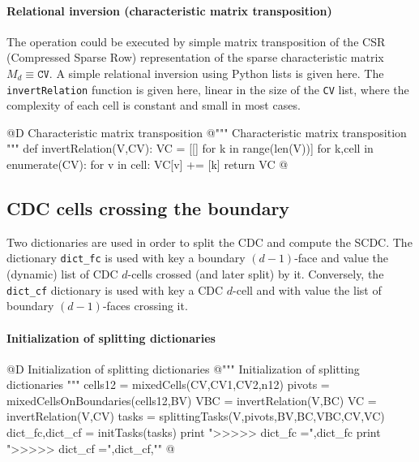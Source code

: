 \documentclass[11pt,oneside]{article}	%
\begin{document}
\paragraph{Relational inversion (characteristic matrix transposition)}

The operation could be executed by simple matrix transposition of the CSR (Compressed Sparse Row) representation of the sparse characteristic matrix $M_d \equiv \texttt{CV}$.
A simple relational inversion using Python lists is given here. The \texttt{invertRelation} function 
is given here, linear in the size of the \texttt{CV} list, where the complexity of each cell is constant and 
small in most cases.

@D Characteristic matrix transposition
@{""" Characteristic matrix transposition """
def invertRelation(V,CV):
	VC = [[] for k in range(len(V))]
	for k,cell in enumerate(CV):
		for v in cell:
			VC[v] += [k]
	return VC
@}

\subsection{CDC cells crossing the boundary}

Two dictionaries are used in order to split the CDC and compute the SCDC. The dictionary \texttt{dict\_fc} is used with key a boundary $(d-1)$-face and value the (dynamic) list of CDC $d$-cells crossed (and later split) by it. Conversely, the  \texttt{dict\_cf} dictionary is used with key a CDC $d$-cell and with value the list of boundary $(d-1)$-faces crossing it.

\paragraph{Initialization of splitting dictionaries}

@D Initialization of splitting dictionaries
@{""" Initialization of splitting dictionaries """
cells12 = mixedCells(CV,CV1,CV2,n12)
pivots = mixedCellsOnBoundaries(cells12,BV)
VBC = invertRelation(V,BC)
VC = invertRelation(V,CV)
tasks = splittingTasks(V,pivots,BV,BC,VBC,CV,VC)
dict_fc,dict_cf = initTasks(tasks)
print "\n>>>>> dict_fc =",dict_fc
print ">>>>> dict_cf =",dict_cf,"\n"
@}
\end{document}

